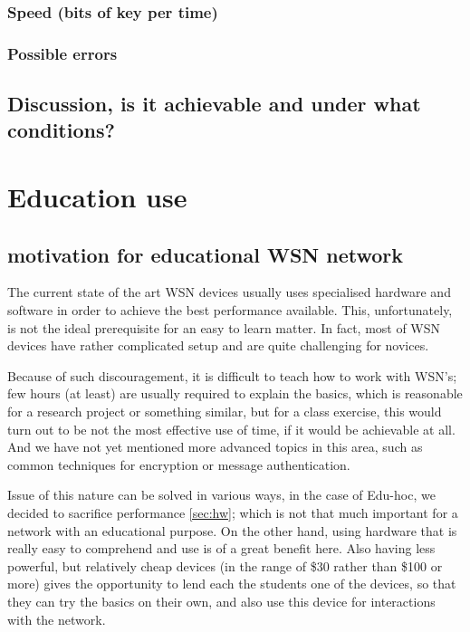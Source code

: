 \documentclass[
  digital, %
  table,   %
  nolof,     %
  nolot,     %
           oneside
]{fithesis3}
\begin{document}
    \subsection{Speed (bits of key per time)}
    \subsection{Possible errors}
  \section{Discussion, is it achievable and under what conditions?}
\chapter{Education use}\label{ch:edu}

  \section{motivation for educational WSN network}
  The current state of the art WSN devices usually uses specialised hardware
  and software in order to achieve the best performance available. %
  This, unfortunately, is not the ideal prerequisite for an easy to learn matter. In fact, most of WSN devices have rather complicated setup and are
  quite challenging for novices. %

  Because of such discouragement, it is difficult to teach how to
  work with WSN’s; few hours (at least) are usually required
  to explain the basics, which is reasonable for a research project or
  something similar, but for a class exercise, this would turn out to be
  not the most effective use of time, if it would be achievable at all. And
  we have not yet mentioned more advanced topics in this area, such as
  common techniques for encryption or message authentication.

  Issue of this nature can be solved in various ways,
  in the case of Edu-hoc, we decided to sacrifice performance \ref{sec:hw}; which is not that much important for a network with an educational purpose. On the other hand, using hardware that is really easy to comprehend and use is of a great benefit here. Also having less powerful, but relatively cheap devices (in the range of \$30 rather than \$100 or more) gives the opportunity to lend each the students one of the devices, so that they can try the basics on their own, and also use this device for interactions with the network.
\end{document}
